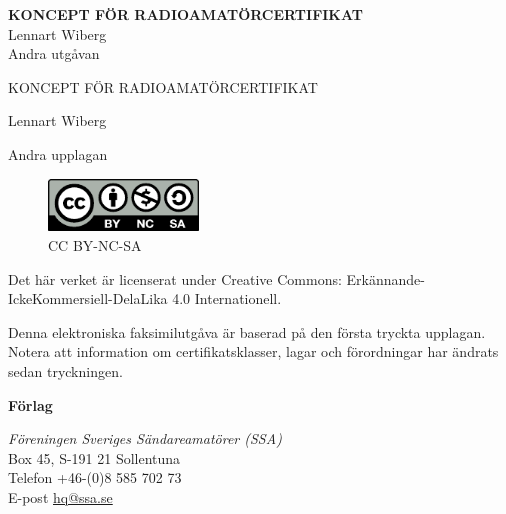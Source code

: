 \documentclass[a4paper,twoside,twocolumn,openright]{book}
\begin{document}
\pagestyle{empty}



\onecolumn
\vspace{3cm}
\begin{center}
\Huge{\bfseries{KONCEPT FÖR RADIOAMATÖRCERTIFIKAT}} \\[2ex]
\huge{Lennart Wiberg} \\
\Large{Andra utgåvan}
\end{center}

\clearpage





\vspace{10em}

\begin{center}
\Large{KONCEPT FÖR RADIOAMATÖRCERTIFIKAT}

Lennart Wiberg\\[2\baselineskip]
\end{center}


\noindent Andra upplagan

\begin{figure}
    \includegraphics[width=4cm]{images/cc-by-nc-sa}
    \caption*{CC BY-NC-SA}
\end{figure}

\noindent Det här verket är licenserat under Creative Commons:
Erkännande-IckeKommersiell-DelaLika 4.0 Internationell.

\noindent Denna elektroniska faksimilutgåva är baserad på den första tryckta
upplagan. Notera att information om certifikatsklasser, lagar och förordningar
har ändrats sedan tryckningen.


\vfill

\noindent
\textbf{Förlag}

\noindent
\textit{Föreningen Sveriges Sändareamatörer (SSA)}\\
Box 45, S-191 21 Sollentuna\\
Telefon +46-(0)8 585 702 73\\
E-post \href{mailto:hq@ssa.se}{hq@ssa.se}\\[\baselineskip]
\end{document}
